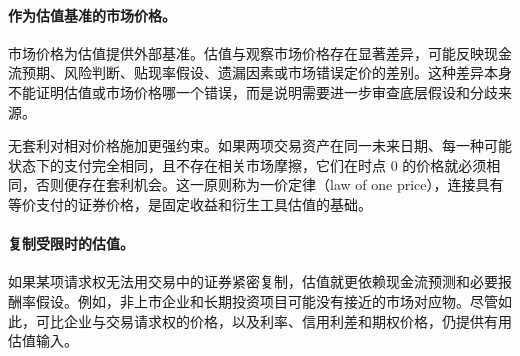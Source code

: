 \paragraph{作为估值基准的市场价格。}
市场价格为估值提供外部基准。估值与观察市场价格存在显著差异，可能反映现金流预期、风险判断、贴现率假设、遗漏因素或市场错误定价的差别。这种差异本身不能证明估值或市场价格哪一个错误，而是说明需要进一步审查底层假设和分歧来源。

无套利对相对价格施加更强约束。如果两项交易资产在同一未来日期、每一种可能状态下的支付完全相同，且不存在相关市场摩擦，它们在时点 0 的价格就必须相同，否则便存在套利机会。这一原则称为一价定律（law of one price），连接具有等价支付的证券价格，是固定收益和衍生工具估值的基础。

\paragraph{复制受限时的估值。}
如果某项请求权无法用交易中的证券紧密复制，估值就更依赖现金流预测和必要报酬率假设。例如，非上市企业和长期投资项目可能没有接近的市场对应物。尽管如此，可比企业与交易请求权的价格，以及利率、信用利差和期权价格，仍提供有用估值输入。

